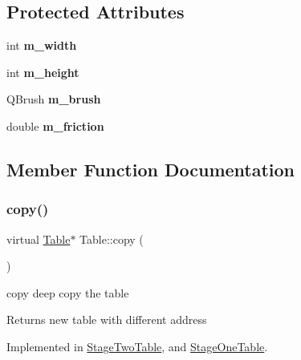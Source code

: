 \subsection*{Protected Attributes}
\begin{DoxyCompactItemize}
\item 
\mbox{\label{class_table_a1e99922a6f86bbbe649c4705590b3409}} 
int {\bfseries m\+\_\+width}
\item 
\mbox{\label{class_table_af1f22da42093769f53dcc3ebe7ea40c0}} 
int {\bfseries m\+\_\+height}
\item 
\mbox{\label{class_table_a9c8db37610dfe62b570c7a386db69939}} 
Q\+Brush {\bfseries m\+\_\+brush}
\item 
\mbox{\label{class_table_aa26465bb9074d6f07dec1a41a06a7d62}} 
double {\bfseries m\+\_\+friction}
\end{DoxyCompactItemize}


\subsection{Member Function Documentation}
\mbox{\label{class_table_a881295d0bea9823026471422ec203c6e}} 
\subsubsection{\texorpdfstring{copy()}{copy()}}
{\footnotesize\ttfamily virtual \mbox{\hyperlink{class_table}{Table}}$\ast$ Table\+::copy (\begin{DoxyParamCaption}{ }\end{DoxyParamCaption})\hspace{0.3cm}{\ttfamily [pure virtual]}}



copy deep copy the table 

\begin{DoxyReturn}{Returns}
new table with different address 
\end{DoxyReturn}


Implemented in \mbox{\hyperlink{class_stage_two_table_ab87e388ca2927670b37dffccb91a76b4}{Stage\+Two\+Table}}, and \mbox{\hyperlink{class_stage_one_table_a03bc7541b29521436c618818d8e8b3dc}{Stage\+One\+Table}}.

